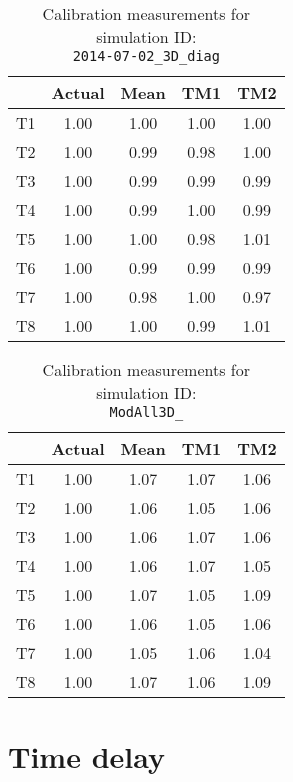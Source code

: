 \begin{table}[H]
\centering
\cprotect\caption{Calibration measurements for simulation ID:\\
\verb|2014-07-02_3D_diag|}
\begin{tabular}{|c|c|c|c|c|} \hline
~ & Actual & Mean & TM1 & TM2 \\ \hline
T1 & 1.00 & 1.00 & 1.00 & 1.00 \\
T2 & 1.00 & 0.99 & 0.98 & 1.00 \\
T3 & 1.00 & 0.99 & 0.99 & 0.99 \\
T4 & 1.00 & 0.99 & 1.00 & 0.99 \\
T5 & 1.00 & 1.00 & 0.98 & 1.01 \\
T6 & 1.00 & 0.99 & 0.99 & 0.99 \\
T7 & 1.00 & 0.98 & 1.00 & 0.97 \\
T8 & 1.00 & 1.00 & 0.99 & 1.01 \\ \hline
\end{tabular}
\label{calib-6}
\end{table}

\begin{table}[H]
\centering
\cprotect\caption{Calibration measurements for simulation ID:\\
\verb|ModAll3D_|}
\begin{tabular}{|c|c|c|c|c|} \hline
~ & Actual & Mean & TM1 & TM2 \\ \hline
T1 & 1.00 & 1.07 & 1.07 & 1.06 \\
T2 & 1.00 & 1.06 & 1.05 & 1.06 \\
T3 & 1.00 & 1.06 & 1.07 & 1.06 \\
T4 & 1.00 & 1.06 & 1.07 & 1.05 \\
T5 & 1.00 & 1.07 & 1.05 & 1.09 \\
T6 & 1.00 & 1.06 & 1.05 & 1.06 \\
T7 & 1.00 & 1.05 & 1.06 & 1.04 \\
T8 & 1.00 & 1.07 & 1.06 & 1.09 \\ \hline
\end{tabular}
\label{calib-7}
\end{table}
\newpage
\section*{Time delay}


